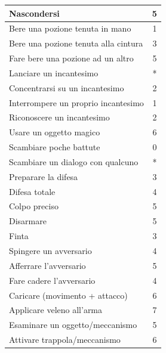 \documentclass[a4paper,twoside,openany]{book}
\begin{document}
\begin{tabularx}{1\linewidth}{Xc}
	\rowcolor{gray!20}Nascondersi& 5\\
	\midrule
	Bere una pozione tenuta in mano& 1\\
	\rowcolor{gray!20}Bere una pozione tenuta alla cintura& 3\\
	Fare bere una pozione ad un altro & 5\\
	\midrule
	\rowcolor{gray!20}Lanciare un incantesimo& *\\
	Concentrarsi su un incantesimo& 2\\
	\rowcolor{gray!20}Interrompere un proprio incantesimo & 1\\
	Riconoscere un incantesimo& 2\\
	\rowcolor{gray!20}Usare un oggetto magico& 6\\
	\midrule
	Scambiare poche battute& 0\\
	\rowcolor{gray!20}Scambiare un dialogo con qualcuno& *\\
	\midrule
	Preparare la difesa & 3\\
	\rowcolor{gray!20}Difesa totale & 4\\
	\midrule
	Colpo preciso & 5\\
	\rowcolor{gray!20}Disarmare & 5\\
	Finta & 3\\
	\rowcolor{gray!20}Spingere un avversario & 4\\
	Afferrare l'avversario & 5\\
	\rowcolor{gray!20}Fare cadere l'avversario & 4\\
	\midrule
	Caricare (movimento + attacco)& 6\\
	Applicare veleno all'arma& 7\\
	Esaminare un oggetto/meccanismo& 5\\
	\rowcolor{gray!20}Attivare trappola/meccanismo& 6\\
	\bottomrule
\end{tabularx}
\end{document}
